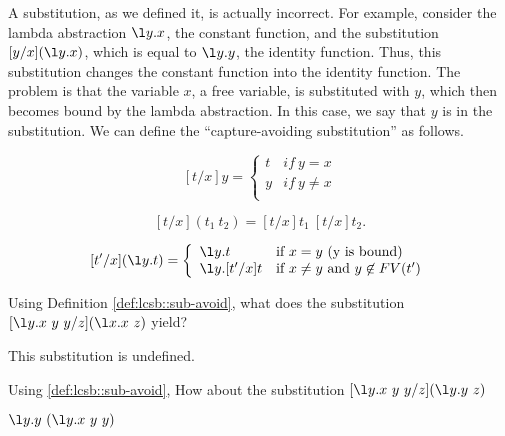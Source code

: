 \begin{gram}[Capture]
\label{grm:lcsb::capture}
A substitution, as we defined it, is actually incorrect.  
%
For example, consider the lambda abstraction $\l y.x$, the constant
function, and the substitution $[y/x](\l y.x)$, which is equal to $\l
y.y$, the identity function.
%
Thus, this substitution changes the constant function into the
identity function.
%
The problem is that the variable $x$, a free
variable, is substituted with $y$, which then becomes bound by the
lambda abstraction.  In this case, we say that $y$ is 
in the substitution.
%
We can define the ``capture-avoiding substitution'' as follows. 
\end{gram}


\begin{definition}
\label{def:lcsb::sub-avoid}
\[
[t/x]y = \left\{ \begin{array}{ll}
        t & if~y = x \\
        y & if~y\neq x \\
        \end{array} \right.
\]


\[
[t/x](t_1~t_2) = [t/x]t_1~[t/x]t_2.
 \]

\[
[t'/x](\l y.t) = 
\left\{ \begin{array}{ll}

\l y.t &\mbox{if}~ x = y \mbox{ (y is bound)} \\

\l y.[t'/x]t &\mbox{if}~ x \neq y \mbox { and } y \not \in FV(t') \\

\end{array} \right. 
\]
\end{definition}

\begin{flex}
\begin{exercise}
\label{xrcs:lcsb::sub-undef}
Using Definition \ref{def:lcsb::sub-avoid},
%
what does the substitution $[\l y.x~y~y/z](\l x.x~z)$ yield?
\end{exercise}
\begin{solution}
\label{sol:lcsb::sub-basic}
This substitution is undefined.
\end{solution}
\end{flex}

\begin{flex}
\begin{exercise}
\label{xrcs:lcsb::sub-rename}
Using \ref{def:lcsb::sub-avoid},
How about the substitution  $[\l y.x~y~y/z](\l y.y~z)$
\end{exercise}
\begin{solution}
$\l y.y~(\l y.x~y~y)$
\end{solution}
\end{flex}



